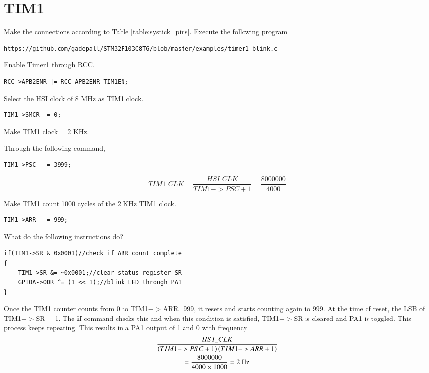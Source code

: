 \documentclass[journal,12pt,twocolumn]{IEEEtran}
\begin{document}
\section{TIM1}
\begin{problem}
Make the connections according to Table \ref{table:systick_pins}.  Execute the following program
\begin{lstlisting}
https://github.com/gadepall/STM32F103C8T6/blob/master/examples/timer1_blink.c
\end{lstlisting}
\end{problem}
\begin{problem}
Enable Timer1 through RCC.
\end{problem}
\solution 
\begin{lstlisting}
RCC->APB2ENR |= RCC_APB2ENR_TIM1EN;  
\end{lstlisting}
\begin{problem}
Select the HSI clock of 8 MHz as TIM1 clock.
\end{problem}
\solution 
\begin{lstlisting}
TIM1->SMCR  = 0;
\end{lstlisting}
\begin{problem}
Make TIM1 clock = 2 KHz.
\end{problem}
\solution Through the following command,
\begin{lstlisting}
TIM1->PSC	= 3999;
\end{lstlisting}
\begin{equation}
TIM1\_CLK = \frac{HSI\_CLK}{TIM1->PSC + 1} = \frac{8000000}{4000}
\end{equation}
\begin{problem}
Make TIM1 count 1000 cycles of the 2 KHz TIM1 clock.
\end{problem}
\solution 
\begin{lstlisting}
TIM1->ARR 	= 999;	
\end{lstlisting}
\begin{problem}
What do the following instructions do?
\begin{lstlisting}
if(TIM1->SR & 0x0001)//check if ARR count complete
{
	TIM1->SR &= ~0x0001;//clear status register SR
	GPIOA->ODR ^= (1 << 1);//blink LED through PA1
}
\end{lstlisting}
\solution Once the TIM1 counter counts from 0 to TIM1$->$ARR=999, it resets and starts counting again to 999.  At the time of
reset, the LSB of TIM1$->$SR = 1.  The \textbf{if} command checks this and when this condition is satisfied, TIM1$->$SR is cleared
and PA1 is toggled.  This process keeps repeating. This results in a PA1  output of 1 and 0 with frequency
\begin{multline}
\frac{HSI\_CLK}{\left(TIM1->PSC + 1\right)\left(TIM1->ARR + 1\right)} 
\\
= \frac{8000000}{4000\times 1000} = 2 \text{ Hz}
\end{multline}
\end{problem}
\end{document}
